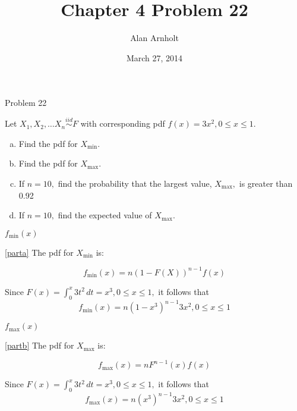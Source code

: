 \documentclass[ignorenonframetext,]{beamer}
\title{Chapter 4 Problem 22}
\author{Alan Arnholt}
\date{March 27, 2014}
\begin{document}
\frame{\titlepage}

\begin{frame}{Problem 22}

Let $X_1, X_2, \ldots X_n \overset{iid}\sim F$ with corresponding pdf
$f(x) = 3x^2, 0\leq x \leq 1.$

\begin{enumerate}[(a)]
\item Find the pdf for $X_{\textrm{min}}.$ \label{parta}
\pause
\item Find the pdf for $X_{\textrm{max}}.$ \label{partb}
\pause
\item If $n = 10,$ find the probability that the largest value, $X_{\textrm{max}},$ is greater than 0.92 \label{partc}
\pause
\item If $n = 10,$ find the expected value of $X_{\textrm{max}}.$ \label{partd}
\end{enumerate}

\end{frame}

\begin{frame}{$f_{\textrm{min}}(x)$}

\eqref{parta} The pdf for $X_{\textrm{min}}$ is:

\begin{equation}\label{Xmin}
f_{\textrm{min}}(x) = n\left(1 - F(X)\right)^{n-1}f(x)
\end{equation}

Since $F(x) = \int_{0}^{x}3t^2\,dt = x^3, 0\leq x \leq 1,$ it follows
that
\[f_{\textrm{min}}(x) = n\left(1 - x^3\right)^{n-1}3x^2,  0\leq x \leq 1\]

\end{frame}

\begin{frame}{$f_{\textrm{max}}(x)$}

\eqref{partb} The pdf for $X_{\textrm{max}}$ is:

\begin{equation}\label{Xmax}
f_{\textrm{max}}(x) = nF^{n-1}(x)f(x)
\end{equation}

Since $F(x) = \int_{0}^{x}3t^2\,dt = x^3, 0\leq x \leq 1,$ it follows
that
\[f_{\textrm{max}}(x) = n\left(x^3\right)^{n-1}3x^2,  0\leq x \leq 1\]

\end{frame}
\end{document}
